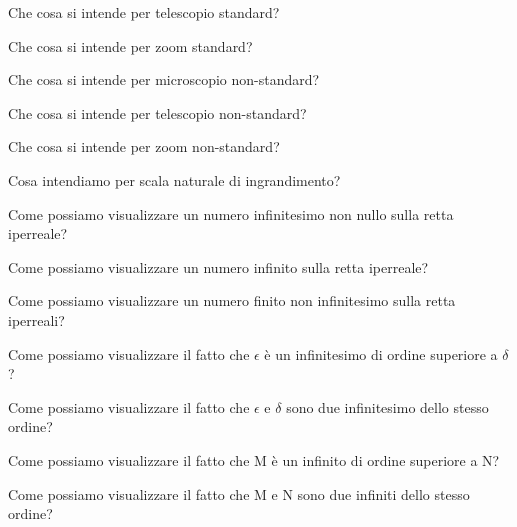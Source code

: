 \begin{multicols}{2}
\begin{esercizio}\label{ese:iper_032}
Che cosa si intende per telescopio standard?
\end{esercizio}

\begin{esercizio}\label{ese:iper_033}
Che cosa si intende per zoom standard?
\end{esercizio}

\begin{esercizio}\label{ese:iper_034}
Che cosa si intende per microscopio non-standard?
\end{esercizio}

\begin{esercizio}\label{ese:iper_035}
Che cosa si intende per telescopio non-standard?
\end{esercizio}

\begin{esercizio}\label{ese:iper_036}
Che cosa si intende per zoom non-standard?
\end{esercizio}

\begin{esercizio}\label{ese:iper_037}
Cosa intendiamo per scala naturale di ingrandimento?
\end{esercizio}

\begin{esercizio}\label{ese:iper_038}
Come possiamo visualizzare un numero infinitesimo non nullo sulla retta 
iperreale?
\end{esercizio}

\begin{esercizio}\label{ese:iper_039}
Come possiamo visualizzare un numero infinito sulla retta iperreale?
\end{esercizio}

\begin{esercizio}\label{ese:iper_040}
Come possiamo visualizzare un numero finito non infinitesimo sulla retta 
iperreali?
\end{esercizio}

\begin{esercizio}\label{ese:iper_041}
Come possiamo visualizzare il fatto che \(\epsilon\) è un infinitesimo di 
ordine superiore a \(\delta\)?
\end{esercizio}

\begin{esercizio}\label{ese:iper_042}
Come possiamo visualizzare il fatto che \(\epsilon\) e \(\delta\) sono due 
infinitesimo dello stesso ordine?
\end{esercizio}

\begin{esercizio}\label{ese:iper_043}
Come possiamo visualizzare il fatto che M è un infinito di ordine superiore 
a N?
\end{esercizio}

\begin{esercizio}\label{ese:iper_044}
Come possiamo visualizzare il fatto che M e N sono due infiniti dello 
stesso ordine?
\end{esercizio}

\end{multicols}

